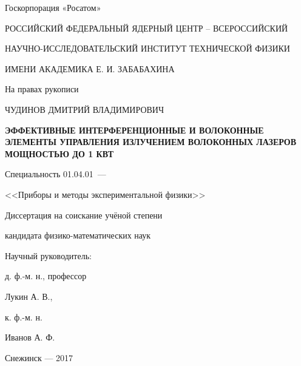 \thispagestyle{empty}

\begin{center}
Госкорпорация «Росатом»\par
РОССИЙСКИЙ ФЕДЕРАЛЬНЫЙ ЯДЕРНЫЙ ЦЕНТР – ВСЕРОССИЙСКИЙ\par
НАУЧНО-ИССЛЕДОВАТЕЛЬСКИЙ ИНСТИТУТ ТЕХНИЧЕСКОЙ ФИЗИКИ\par
ИМЕНИ АКАДЕМИКА Е. И. ЗАБАБАХИНА\par
\par
\end{center}

\vspace{20mm}
\begin{flushright}
На правах рукописи

\end{flushright}

\vspace{30mm}
\begin{center}
{\large ЧУДИНОВ ДМИТРИЙ ВЛАДИМИРОВИЧ}
\end{center}

\vspace{5mm}
\begin{center}
{\bf \large ЭФФЕКТИВНЫЕ ИНТЕРФЕРЕНЦИОННЫЕ И ВОЛОКОННЫЕ ЭЛЕМЕНТЫ УПРАВЛЕНИЯ ИЗЛУЧЕНИЕМ ВОЛОКОННЫХ ЛАЗЕРОВ
МОЩНОСТЬЮ ДО 1 КВТ
\par}

\vspace{10mm}
{%
Специальность 01.04.01~---

<<Приборы и методы экспериментальной физики>>
}

\vspace{10mm}
Диссертация на соискание учёной степени

кандидата физико-математических наук
\end{center}

\vspace{20mm}
\begin{flushright}
Научный руководитель:

д. ф.-м. н., профессор

Лукин А. В.,



к. ф.-м. н.

Иванов А. Ф.

\end{flushright}

\vspace{20mm}
\begin{center}
{Снежинск --- 2017}
\end{center}

\newpage
